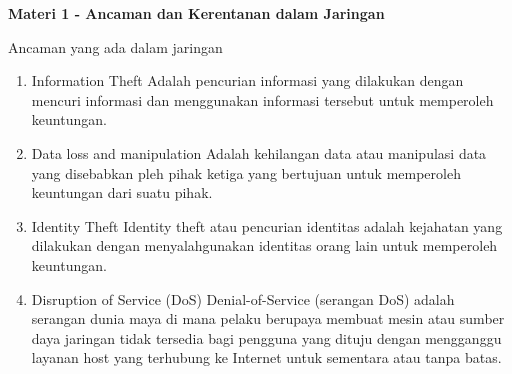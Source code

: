 \documentclass{article}
\begin{document}
    \begin{flushleft}
        \textbf{Materi 1 - Ancaman dan Kerentanan dalam Jaringan}
        \newline

        Ancaman yang ada dalam jaringan 
        \begin{enumerate}
            \item Information Theft \newline
            Adalah pencurian informasi yang dilakukan dengan mencuri informasi dan menggunakan informasi tersebut untuk memperoleh keuntungan.

            \item Data loss and manipulation \newline
            Adalah kehilangan data atau manipulasi data yang disebabkan pleh pihak ketiga yang bertujuan untuk memperoleh keuntungan dari suatu pihak.

            \item Identity Theft \newline
            Identity theft atau pencurian identitas adalah kejahatan yang dilakukan dengan menyalahgunakan identitas orang lain untuk memperoleh keuntungan.

            \item Disruption of Service (DoS) \newline
            Denial-of-Service (serangan DoS) adalah serangan dunia maya di mana pelaku berupaya membuat mesin atau sumber daya jaringan tidak tersedia bagi pengguna yang dituju dengan mengganggu layanan host yang terhubung ke Internet untuk sementara atau tanpa batas.
        \end{enumerate}
    \end{flushleft}
\end{document}

